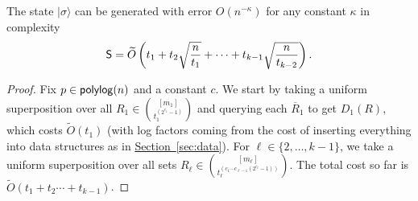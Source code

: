 \documentclass{theoretics}
\renewcommand{\sec}[1]{\hyperref[sec:#1]{Section~\ref*{sec:#1}}}
\def\ket#1{{\lvert}#1\rangle}
\renewcommand{\>}{\rangle}
\newcommand{\<}{\langle}
\renewcommand{\(}{\left(}
\renewcommand{\)}{\right)}
\begin{document}
\begin{lemma}\label{lem:setupk}
	The state $\ket{\sigma}$ can be generated with error $O(n^{-\kappa})$ for any constant $\kappa$ in complexity
	\begin{equation*}
		{\sf S}=\widetilde{O}\left(t_1+t_2\sqrt{\frac{n}{t_1}} + \cdots + t_{k-1}\sqrt{\frac{n}{t_{k-2}}}\right).
	\end{equation*}
\end{lemma}
\begin{proof}
Fix $p\in {\sf polylog}(n)$ and a constant $c$.
	We start by taking a uniform superposition over all $R_1\in \binom{[m_1]}{t_1^{(2^{c_{1}}-1)}}$ and querying each $\overline{R}_1$ to get $D_1(R)$, which costs $\widetilde{O}(t_1)$ (with log factors coming from the cost of inserting everything into data structures as in \sec{data}). For $\ell\in\{2,\dots,k-1\}$, we take a uniform superposition over all sets $R_{\ell} \in \binom{[m_{\ell}]}{t_{\ell}^{(c_1\cdots c_{\ell-1}(2^{c_{\ell}}-1))}}$. The total cost so far is $\widetilde{O}(t_1+t_2 \cdots + t_{k-1})$. 


\end{proof}
\end{document}
